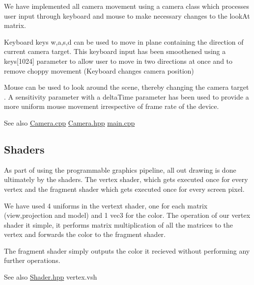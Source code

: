 We have implemented all camera movement using a camera class which processes user input through keyboard and mouse to make necessary changes to the look\+At matrix.
\begin{DoxyItemize}
\item Keyboard keys w,a,s,d can be used to move in plane containing the direction of current camera target. This keyboard input has been smoothened using a keys\mbox{[}1024\mbox{]} parameter to allow user to move in two directions at once and to remove choppy movement (Keyboard changes camera position)
\item Mouse can be used to look around the scene, thereby changing the camera target . A sensitivity parameter with a delta\+Time parameter has been used to provide a more uniform mouse movement irrespective of frame rate of the device.
\end{DoxyItemize}

\begin{DoxySeeAlso}{See also}
\hyperlink{_camera_8cpp}{Camera.\+cpp} \hyperlink{_camera_8hpp}{Camera.\+hpp} \hyperlink{main_8cpp}{main.\+cpp}
\end{DoxySeeAlso}
\hypertarget{index_a3}{}\subsection{Shaders}\label{index_a3}
As part of using the programmable graphics pipeline, all out drawing is done ultimately by the shaders. The vertex shader, which gets executed once for every vertex and the fragment shader which gets executed once for every screen pixel.
\begin{DoxyItemize}
\item We have used 4 uniforms in the vertext shader, one for each matrix (view,projection and model) and 1 vec3 for the color. The operation of our vertex shader it simple, it performs matrix multiplication of all the matrices to the vertex and forwards the color to the fragment shader.
\item The fragment shader simply outputs the color it recieved without performing any further operations.
\end{DoxyItemize}

\begin{DoxySeeAlso}{See also}
\hyperlink{_shader_8hpp}{Shader.\+hpp} vertex.\+vsh 
\end{DoxySeeAlso}
